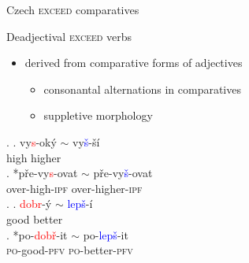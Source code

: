 \documentclass[12pt]{beamer}
\begin{document}
\begin{frame}{Czech \textsc{exceed} comparatives}

Deadjectival \textsc{exceed} verbs

\begin{itemize}
\item derived from comparative forms of adjectives
\begin{itemize}
\item consonantal alternations in comparatives
\item suppletive morphology
\end{itemize}
\end{itemize}

\ex. \ag. {vy\textcolor{red}{s}-oký $\sim$} vy\textcolor{blue}{š}-ší\\
high higher\\
\bg. *{pře-vy\textcolor{red}{s}-ovat $\sim$} pře-vy\textcolor{blue}{š}-ovat\\
over-high-\textsc{ipf} over-higher-\textsc{ipf}\\

\ex. \ag. {\textcolor{red}{dobr}-ý $\sim$} \textcolor{blue}{lepš}-í\\
good better\\
\bg. *{po-\textcolor{red}{dobř}-it $\sim$} po-\textcolor{blue}{lepš}-it\\
\textsc{po}-good-\textsc{pfv} \textsc{po}-better-\textsc{pfv}\\

\end{frame}
\end{document}
